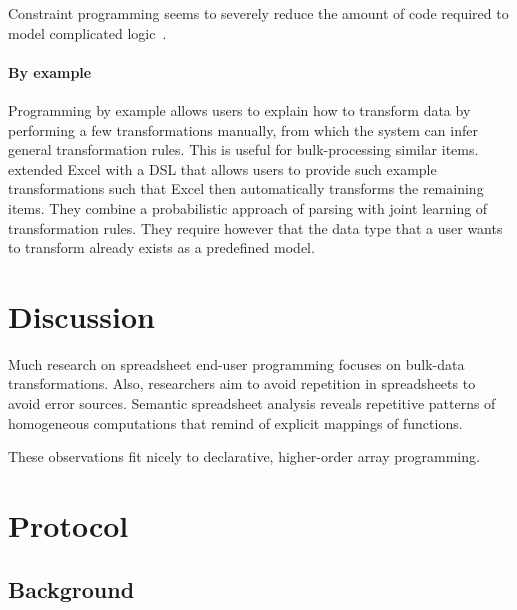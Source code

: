 \documentclass[a4paper]{article}
\begin{document}
Constraint programming seems to severely reduce the amount of code
required to model complicated
logic~\cite{Stadelmann:1993:SBC:168642.168664}.

\paragraph{By example}

Programming by example allows users to explain how to transform data
by performing a few transformations manually, from which the system
can infer general transformation rules. This is useful for
bulk-processing similar items. \citet{Singh:2016:TSD:2837614.2837668}
extended Excel with a DSL that allows users to provide such example
transformations such that Excel then automatically transforms the
remaining items. They combine a probabilistic approach of parsing with
joint learning of transformation rules. They require however that the
data type that a user wants to transform already exists as a
predefined model.

\section{Discussion}
\label{sec:discussion}

Much research on spreadsheet end-user programming focuses on bulk-data
transformations. Also, researchers aim to avoid repetition in
spreadsheets to avoid error sources. Semantic spreadsheet analysis
reveals repetitive patterns of homogeneous computations that remind of
explicit mappings of functions.

These observations fit nicely to declarative, higher-order array
programming. 




\appendix

\newpage{}

\section{Protocol}
\label{sec:protocol}

\subsection{Background}
\label{sec:background}
\end{document}
